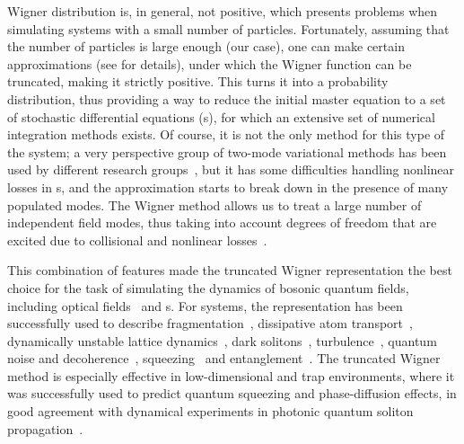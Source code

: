 Wigner distribution is, in general, not positive, which presents problems when simulating systems with a small number of particles.
Fortunately, assuming that the number of particles is large enough (our case), one can make certain approximations (see  for details), under which the Wigner function can be truncated, making it strictly positive.
This turns it into a probability distribution, thus providing a way to reduce the initial master equation to a set of stochastic differential equations (s), for which an extensive set of numerical integration methods exists.
Of course, it is not the only method for this type of the system; a very perspective group of two-mode variational methods has been used by different research groups~\cite{Li2008,Li2009,Sinatra2011}, but it has some difficulties handling nonlinear losses in s, and the approximation starts to break down in the presence of many populated modes.
The Wigner method allows us to treat a large number of independent field modes, thus taking into account degrees of freedom that are excited due to collisional and nonlinear losses~\cite{Norrie2005,Deuar2007}.

This combination of features made the truncated Wigner representation the best choice for the task of simulating the dynamics of bosonic quantum fields, including optical fields~\cite{Drummond1993,Drummond1993a,Corney2006,Corney2008} and s.
For  systems, the representation has been successfully used to describe fragmentation~\cite{Isella2005,Isella2006,Gross2011}, dissipative atom transport~\cite{Ruostekoski2005}, dynamically unstable lattice dynamics~\cite{Shrestha2009}, dark solitons~\cite{Martin2010,Martin2010a}, turbulence~\cite{Norrie2005,Norrie2006}, quantum noise and decoherence~\cite{Steel1998,Norrie2006a,Egorov2011}, squeezing~\cite{Opanchuk2012} and entanglement~\cite{Opanchuk2012a}.
The truncated Wigner method is especially effective in low-dimensional and trap environments, where it was successfully used to predict quantum squeezing and phase-diffusion effects, in good agreement with dynamical experiments in photonic quantum soliton propagation~\cite{Carter1987,Corney2008}.

